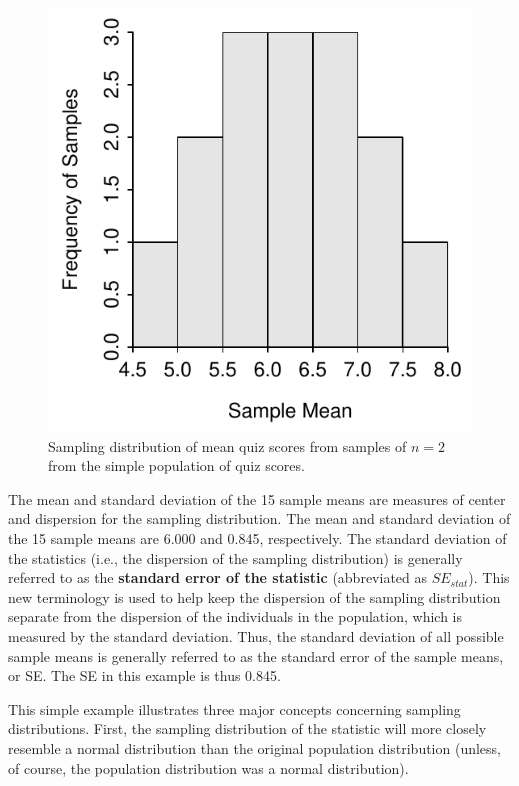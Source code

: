 \documentclass[10pt,openany]{book}\usepackage[]{graphicx}\usepackage[]{color}
\newenvironment{knitrout}{}{} %
\begin{document}
\begin{knitrout}
\color{fgcolor}\begin{figure}[hbtp]

{\centering \includegraphics[width=.4\linewidth]{Figs/SDistQuiz2-1} 

}

\caption[Sampling distribution of mean quiz scores from samples of $n=2$ from the simple population of quiz scores]{Sampling distribution of mean quiz scores from samples of $n=2$ from the simple population of quiz scores.}\label{fig:SDistQuiz2}
\end{figure}


\end{knitrout}

The mean and standard deviation of the 15 sample means are measures of center and dispersion for the sampling distribution.  The mean and standard deviation of the 15 sample means are 6.000 and 0.845, respectively.  The standard deviation of the statistics (i.e., the dispersion of the sampling distribution) is generally referred to as the \textbf{standard error of the statistic} (abbreviated as $SE_{stat}$).  This new terminology is used to help keep the dispersion of the sampling distribution separate from the dispersion of the individuals in the population, which is measured by the standard deviation.  Thus, the standard deviation of all possible sample means is generally referred to as the standard error of the sample means, or SE.  The SE in this example is thus 0.845.


This simple example illustrates three major concepts concerning sampling distributions.  First, the sampling distribution of the statistic will more closely resemble a normal distribution than the original population distribution (unless, of course, the population distribution was a normal distribution).
\end{document}
